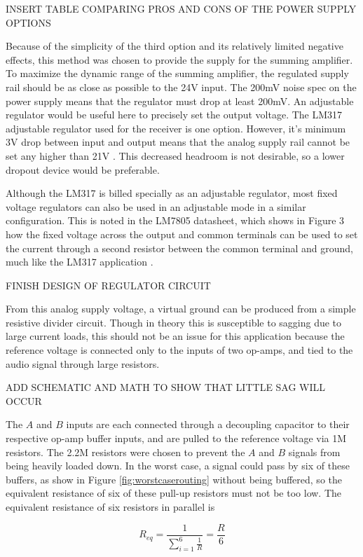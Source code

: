 \documentclass{article}
\begin{document}
	INSERT TABLE COMPARING PROS AND CONS OF THE POWER SUPPLY OPTIONS

	Because of the simplicity of the third option and its relatively limited negative effects, this method was chosen to provide the supply for the summing amplifier.  To maximize the dynamic range of the summing amplifier, the regulated supply rail should be as close as possible to the 24V input.  The 200mV noise spec on the power supply means that the regulator must drop at least 200mV.  An adjustable regulator would be useful here to precisely set the output voltage.  The LM317 adjustable regulator used for the receiver is one option.  However, it's minimum 3V drop between input and output means that the analog supply rail cannot be set any higher than 21V \cite{atasheet:LM317}.  This decreased headroom is not desirable, so a lower dropout device would be preferable.

	Although the LM317 is billed specially as an adjustable regulator, most fixed voltage regulators can also be used in an adjustable mode in a similar configuration.  This is noted in the LM7805 datasheet, which shows in Figure 3 how the fixed voltage across the output and common terminals can be used to set the current through a second resistor between the common terminal and ground, much like the LM317 application \cite{datasheet:LM7805}.

	FINISH DESIGN OF REGULATOR CIRCUIT

	From this analog supply voltage, a virtual ground can be produced from a simple resistive divider circuit.  Though in theory this is susceptible to sagging due to large current loads, this should not be an issue for this application because the reference voltage is connected only to the inputs of two op-amps, and tied to the audio signal through large resistors.

	ADD SCHEMATIC AND MATH TO SHOW THAT LITTLE SAG WILL OCCUR

	The $A$ and $B$ inputs are each connected through a decoupling capacitor to their respective op-amp buffer inputs, and are pulled to the reference voltage via 1M resistors.  The 2.2M resistors were chosen to prevent the $A$ and $B$ signals from being heavily loaded down.  In the worst case, a signal could pass by six of these buffers, as show in Figure \ref{fig:worstcaserouting} without being buffered, so the equivalent resistance of six of these pull-up resistors must not be too low.  The equivalent resistance of six resistors in parallel is

	$$ R_{eq} = \frac{1}{\sum\limits_{i=1}^{6}\frac{1}{R}} = \frac{R}{6} $$
\end{document}
